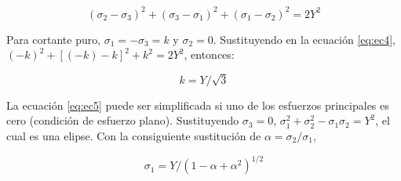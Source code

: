 \begin{equation}\label{eq:ec4}
(\sigma_2-\sigma_3)^2 + (\sigma_3-\sigma_1 )^2 + (\sigma_1-\sigma_2 )^2 = 2Y^2
\end{equation}

Para cortante puro, $\sigma_1 = -\sigma_3 = k$ y $\sigma_2=0$. Sustituyendo en la ecuación \ref{eq:ec4}, 
$ (-k)^2 + [ (-k)-k ]^2 + k^2 = 2Y^2 $, entonces:

\begin{equation}\label{eq:ec5}
k = Y/\sqrt{3}
\end{equation}

La ecuación \ref{eq:ec5} puede ser simplificada si uno de los esfuerzos principales es cero (condición de esfuerzo plano). 
Sustituyendo $\sigma_3 = 0$, $\sigma_1^2 + \sigma_2^2 - \sigma_1 \sigma_2 = Y^2$, el cual es una elipse. Con la 
consiguiente sustitución de $\alpha = \sigma_2/\sigma_1$,

\begin{equation}
\sigma_1 = Y/(1-\alpha+\alpha^2)^{1/2}
\end{equation}






